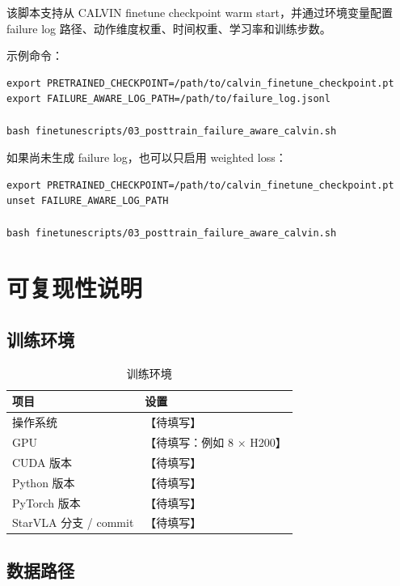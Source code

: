 \documentclass[10pt,a4paper,fontset=none]{ctexart}
\newcommand{\todo}[1]{\textcolor{TodoRed}{【#1】}}
\newcommand{\TrainingDevice}{\todo{待填写：例如 8 × H200}}
\begin{document}
该脚本支持从 CALVIN finetune checkpoint warm start，并通过环境变量配置 failure log 路径、动作维度权重、时间权重、学习率和训练步数。

示例命令：

\begin{lstlisting}[caption={启用 failure-aware 后训练}]
export PRETRAINED_CHECKPOINT=/path/to/calvin_finetune_checkpoint.pt
export FAILURE_AWARE_LOG_PATH=/path/to/failure_log.jsonl

bash finetunescripts/03_posttrain_failure_aware_calvin.sh
\end{lstlisting}

如果尚未生成 failure log，也可以只启用 weighted loss：

\begin{lstlisting}[caption={只启用 weighted loss}]
export PRETRAINED_CHECKPOINT=/path/to/calvin_finetune_checkpoint.pt
unset FAILURE_AWARE_LOG_PATH

bash finetunescripts/03_posttrain_failure_aware_calvin.sh
\end{lstlisting}

\section{可复现性说明}

\subsection{训练环境}

\begin{table}[H]
\centering
\caption{训练环境}
\begin{tabularx}{0.86\textwidth}{lX}
\toprule
项目 & 设置 \\
\midrule
操作系统 & \todo{待填写} \\
GPU & \TrainingDevice{} \\
CUDA 版本 & \todo{待填写} \\
Python 版本 & \todo{待填写} \\
PyTorch 版本 & \todo{待填写} \\
StarVLA 分支 / commit & \todo{待填写} \\
\bottomrule
\end{tabularx}
\end{table}

\subsection{数据路径}
\end{document}
